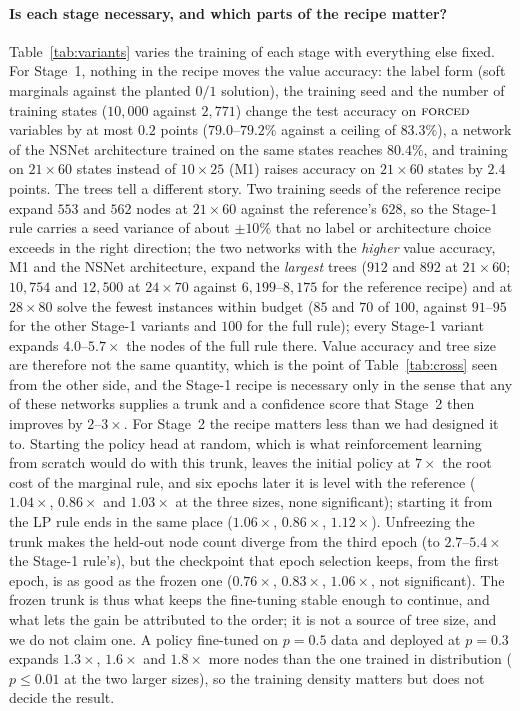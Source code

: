 \documentclass[final,5p,times,twocolumn,authoryear]{elsarticle}
\newcommand{\FORCED}{\textsc{forced}}
\begin{document}
\paragraph{Is each stage necessary, and which parts of the recipe matter?} Table~\ref{tab:variants} varies the training of each stage with everything else fixed. For Stage~1, nothing in the recipe moves the value accuracy: the label form (soft marginals against the planted $0/1$ solution), the training seed and the number of training states ($10{,}000$ against $2{,}771$) change the test accuracy on $\FORCED$ variables by at most $0.2$ points ($79.0$--$79.2\%$ against a ceiling of $83.3\%$), a network of the NSNet architecture \citep{li2022nsnet} trained on the same states reaches $80.4\%$, and training on $21\times60$ states instead of $10\times25$ (M1) raises accuracy on $21\times60$ states by $2.4$ points. The trees tell a different story. Two training seeds of the reference recipe expand $553$ and $562$ nodes at $21\times60$ against the reference's $628$, so the Stage-1 rule carries a seed variance of about $\pm10\%$ that no label or architecture choice exceeds in the right direction; the two networks with the \emph{higher} value accuracy, M1 and the NSNet architecture, expand the \emph{largest} trees ($912$ and $892$ at $21\times60$; $10{,}754$ and $12{,}500$ at $24\times70$ against $6{,}199$--$8{,}175$ for the reference recipe) and at $28\times80$ solve the fewest instances within budget ($85$ and $70$ of $100$, against $91$--$95$ for the other Stage-1 variants and $100$ for the full rule); every Stage-1 variant expands $4.0$--$5.7\times$ the nodes of the full rule there.
Value accuracy and tree size are therefore not the same quantity, which is the point of Table~\ref{tab:cross} seen from the other side, and the Stage-1 recipe is necessary only in the sense that any of these networks supplies a trunk and a confidence score that Stage~2 then improves by $2$--$3\times$.
For Stage~2 the recipe matters less than we had designed it to. Starting the policy head at random, which is what reinforcement learning from scratch would do with this trunk, leaves the initial policy at $7\times$ the root cost of the marginal rule, and six epochs later it is level with the reference ($1.04\times$, $0.86\times$ and $1.03\times$ at the three sizes, none significant); starting it from the LP rule ends in the same place ($1.06\times$, $0.86\times$, $1.12\times$). Unfreezing the trunk makes the held-out node count diverge from the third epoch (to $2.7$--$5.4\times$ the Stage-1 rule's), but the checkpoint that epoch selection keeps, from the first epoch, is as good as the frozen one ($0.76\times$, $0.83\times$, $1.06\times$, not significant). The frozen trunk is thus what keeps the fine-tuning stable enough to continue, and what lets the gain be attributed to the order; it is not a source of tree size, and we do not claim one. A policy fine-tuned on $p=0.5$ data and deployed at $p=0.3$ expands $1.3\times$, $1.6\times$ and $1.8\times$ more nodes than the one trained in distribution ($p\le0.01$ at the two larger sizes), so the training density matters but does not decide the result.
\end{document}
